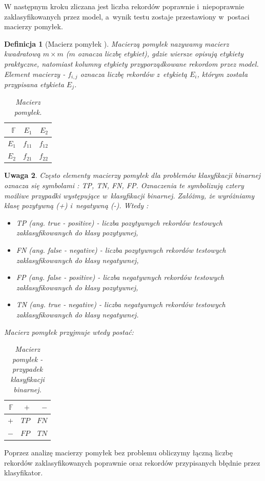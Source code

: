 \documentclass[12pt,a4paper]{report}
\newtheorem{df}{Definicja}[chapter]
\newtheorem{uwaga}[df]{Uwaga}
\begin{document}
W następnym kroku zliczana jest liczba rekordów poprawnie i~niepoprawnie zaklasyfikowanych przez model, a~wynik testu zostaje przestawiony w~postaci macierzy pomyłek.
\begin{df}[Macierz pomyłek {\citep[Sec 4.8.1]{edmia}}]
Macierzą pomyłek nazywamy macierz kwadratową $ m \times m$ ($m$ oznacza liczbę etykiet), gdzie wiersze opisują etykiety praktyczne, natomiast kolumny etykiety przyporządkowane rekordom przez model. Element macierzy - $f_{i,j}$ oznacza liczbę rekordów z~etykietą $E_i$, którym została przypisana etykieta $E_j$.
\begin{table}[H]
\begin{center}
\begin{tabular}{|r|r|r|} \hline
$\mathbb{F}$ & $E_1$ & $E_2$\\
\hline 
$E_1$ & $f_{11}$ & $f_{12}$ \\
\hline
$E_2$ & $f_{21}$ & $f_{22}$  \\
\hline
\end{tabular}
\end{center}
\caption{Macierz pomyłek.}
\label{tabelka}
\end{table}
\end{df}
\begin{uwaga}{\citep[Sec 4.8.1]{edmia}}
Często elementy macierzy pomyłek dla problemów klasyfikacji binarnej oznacza się symbolami : TP, TN, FN, FP. Oznaczenia te symbolizują cztery możliwe przypadki występujące w~klasyfikacji binarnej. Załóżmy, że wyróżniamy klasę pozytywną (+) i~negatywną (-). Wtedy :
\begin{itemize}
\item TP (ang. true - positive) - liczba pozytywnych rekordów testowych zaklasyfikowanych do klasy pozytywnej,
\item FN (ang. false - negative) - liczba pozytywnych rekordów testowych zaklasyfikowanych do klasy negatywnej,
\item FP (ang. false - positive) - liczba negatywnych rekordów testowych zaklasyfikowanych do klasy pozytywnej,
\item TN (ang. true - negative) - liczba negatywnych rekordów testowych zaklasyfikowanych do klasy negatywnej.
\end{itemize}
Macierz pomyłek przyjmuje wtedy postać:
\begin{table}[H]
\begin{center}
\begin{tabular}{|r|r|r|} \hline
$\mathbb{F}$ & $+$ & $-$\\
\hline
$+$ & $TP$ & $FN$ \\
\hline
$-$ & $FP$ & $TN$  \\
\hline
\end{tabular}
\end{center}
\caption{Macierz pomyłek - przypadek klasyfikacji binarnej.}
\label{tabelka}
\end{table}
\end{uwaga}
Poprzez analizę macierzy pomyłek bez problemu obliczymy łączną liczbę rekordów zaklasyfikowanych poprawnie oraz rekordów przypisanych błędnie przez klasyfikator. 
\end{document}
